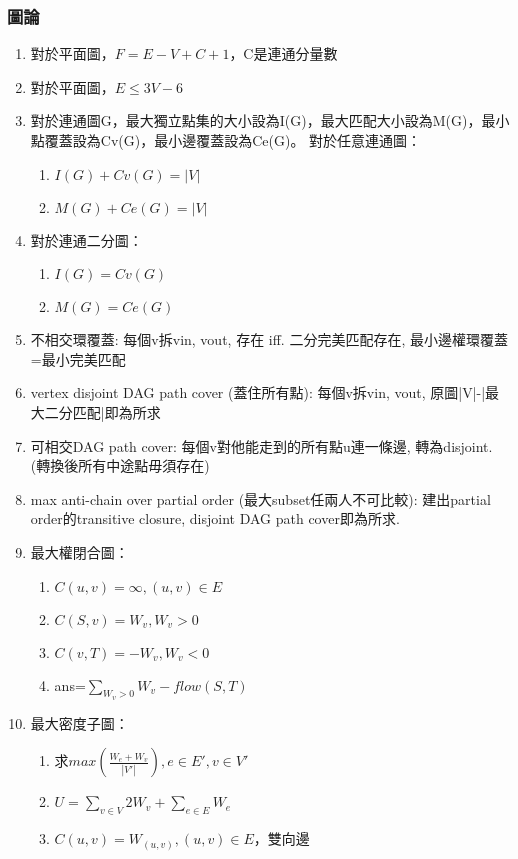 \subsubsection{圖論}
\begin{enumerate}\itemsep = -5pt
\item 對於平面圖，$F=E-V+C+1$，C是連通分量數
\item 對於平面圖，$E\leq 3V-6$
\item 對於連通圖G，最大獨立點集的大小設為I(G)，最大匹配大小設為M(G)，最小點覆蓋設為Cv(G)，最小邊覆蓋設為Ce(G)。
對於任意連通圖：
	\begin{enumerate}\itemsep = -3pt
	\item $I(G)+Cv(G)=|V|$
	\item $M(G)+Ce(G)=|V|$
	\end{enumerate}
\item 對於連通二分圖：
	\begin{enumerate}\itemsep = -3pt
	\item $I(G)=Cv(G)$
	\item $M(G)=Ce(G)$
	\end{enumerate}
\item 不相交環覆蓋: 每個v拆vin, vout, 存在 iff. 二分完美匹配存在, 最小邊權環覆蓋=最小完美匹配
\item vertex disjoint DAG path cover (蓋住所有點): 每個v拆vin, vout, 原圖|V|-|最大二分匹配|即為所求
\item 可相交DAG path cover: 每個v對他能走到的所有點u連一條邊, 轉為disjoint. (轉換後所有中途點毋須存在)
\item max anti-chain over partial order (最大subset任兩人不可比較): 建出partial order的transitive closure, disjoint DAG path cover即為所求.
\item 最大權閉合圖：
	\begin{enumerate}\itemsep = -3pt
	\item $C(u,v)=\infty ,(u,v)\in E$
	\item $C(S,v)=W_v ,W_v>0$
	\item $C(v,T)=-W_v ,W_v<0$
	\item ans=$\sum_{W_v>0} W_v-flow(S,T)$
	\end{enumerate}
\item 最大密度子圖：
	\begin{enumerate}\itemsep = -1pt
	\item 求$max\left(\frac{W_e+W_v}{|V'|}\right),e \in E',v \in V'$
	\item $U=\sum_{v \in V}2W_v+\sum_{e \in E} W_e$
	\item $C(u,v)=W_{(u,v)} ,(u,v)\in E$，雙向邊

\end{enumerate}
\end{enumerate}
